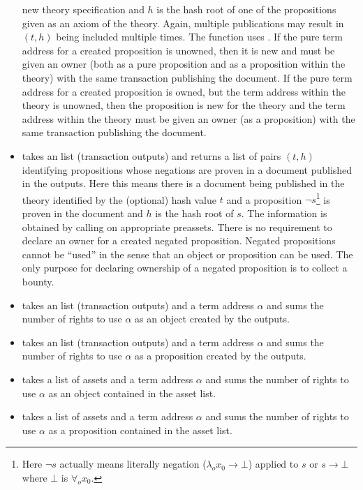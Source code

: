 \begin{itemize}
new theory specification and $h$ is the hash root of one of the propositions given as an axiom of the theory.
Again, multiple publications may result in $(t,h)$ being included multiple times.
The function uses {}.
If the pure term address for a created proposition is unowned,
then it is new and must be given an owner (both as a pure proposition
and as a proposition within the theory) with the same transaction
publishing the document.
If the pure term address for a created proposition is owned,
but the term address within the theory is unowned, then
the proposition is new for the theory and the term address within the theory
must be given an owner (as a proposition) with the same transaction
publishing the document.
\item {} takes
an {} list (transaction outputs)
and returns a list of pairs $(t,h)$
identifying propositions whose negations are proven in a document published in the outputs.
Here this means there is a document being published in the theory identified by the
(optional) hash value $t$
and a proposition $\neg s$\footnote{Here $\neg s$ actually means literally negation ($\lambda_o x_0\to\bot$) applied to $s$ or $s\to\bot$ where $\bot$ is $\forall_o x_0$.}
is proven in the document and $h$ is the hash root of $s$.
The information is obtained by calling {} on appropriate preassets.
There is no requirement to declare an owner for a created negated proposition.
Negated propositions cannot be ``used'' in the sense that an object or proposition can
be used. The only purpose for declaring ownership of a negated proposition is to collect a bounty.
\item {} takes an {} list (transaction outputs)
and a term address $\alpha$ and sums the number of rights to use $\alpha$ as an object
created by the outputs.
\item {} takes an {} list (transaction outputs)
and a term address $\alpha$ and sums the number of rights to use $\alpha$ as a proposition
created by the outputs.
\item {} takes a list of assets and a term address $\alpha$
and sums the number of rights to use $\alpha$ as an object contained in the asset list.
\item {} takes a list of assets and a term address $\alpha$
and sums the number of rights to use $\alpha$ as a proposition contained in the asset list.

\end{itemize}
